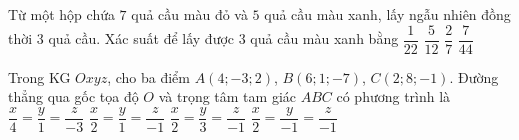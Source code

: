 \begin{ex}%
	Từ một hộp chứa $7$ quả cầu màu đỏ và $5$ quả cầu màu xanh, lấy ngẫu nhiên đồng thời $3$ quả cầu. Xác suất để lấy được $3$ quả cầu màu xanh bằng
	\choice
	{\True $\dfrac{1}{22}$}
	{$\dfrac{5}{12}$}
	{$\dfrac{2}{7}$}
	{$\dfrac{7}{44}$}
\end{ex}
\begin{ex}%
	Trong KG $Oxyz$, cho ba điểm $A(4;-3;2)$, $B(6;1;-7)$, $C(2;8;-1)$. Đường thẳng qua gốc tọa độ $O$ và trọng tâm tam giác $ABC$ có phương trình là
	\choice
	{$\dfrac{x}{4}=\dfrac{y}{1}=\dfrac{z}{-3}$}
	{\True $\dfrac{x}{2}=\dfrac{y}{1}=\dfrac{z}{-1}$}
	{$\dfrac{x}{2}=\dfrac{y}{3}=\dfrac{z}{-1}$}
	{$\dfrac{x}{2}=\dfrac{y}{-1}=\dfrac{z}{-1}$}
\end{ex}
